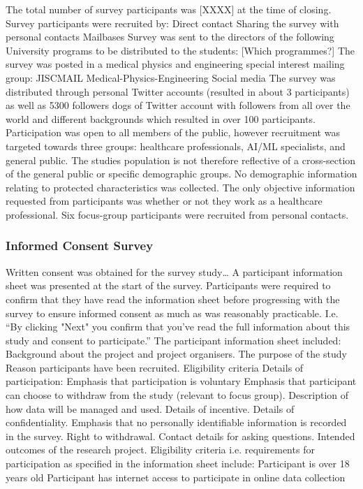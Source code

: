 \documentclass[manuscript,screen,review]{acmart}
\begin{document}
The total number of survey participants was [XXXX] at the time of closing.
Survey participants were recruited by:
Direct contact
Sharing the survey with personal contacts
Mailbases 
Survey was sent to the directors of the following University programs to be  distributed to the students:
[Which programmes?]
The survey was posted in a medical physics and engineering special interest mailing group: JISCMAIL Medical-Physics-Engineering 
Social media
The survey was distributed through personal Twitter accounts (resulted in about 3 participants) as well as 5300 followers dogs of Twitter account with followers from all over the world and different backgrounds which resulted in over 100 participants.
Participation was open to all members of the public, however recruitment was targeted towards three groups: healthcare professionals, AI/ML specialists, and general public. The studies population is not therefore reflective of a cross-section of the general public or specific demographic groups. 
No demographic information relating to protected characteristics was collected. 
The only objective information requested from participants was whether or not they work as a healthcare professional. 
Six focus-group participants were recruited from personal contacts. 

\subsubsection{Informed Consent Survey}  


Written consent was obtained for the survey study…
A participant information sheet was presented at the start of the survey. Participants were required to confirm that they have read the information sheet before progressing with the survey to ensure informed consent as much as was reasonably practicable. 
I.e. “By clicking "Next" you confirm that you've read the full information about this study and consent to participate.”
The participant information sheet included:
Background about the project and project organisers.
The purpose of the study
Reason participants have been recruited. 
Eligibility criteria
Details of participation:
Emphasis that participation is voluntary
Emphasis that participant can choose to withdraw from the study (relevant to focus group).
Description of how data will be managed and used.
Details of incentive.
Details of confidentiality. 
Emphasis that no personally identifiable information is recorded in the survey. 
Right to withdrawal.
Contact details for asking questions. 
Intended outcomes of the research project.
Eligibility criteria i.e. requirements for participation as specified in the information sheet include:
Participant is over 18 years old
Participant has internet access to participate in online data collection
\end{document}
